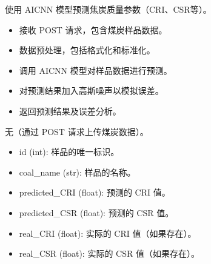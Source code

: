 \documentclass[a4paper,12pt,english]{sphinxmanual}
\begin{document}

\begin{fulllineitems}
\label{\detokenize{api/login:login.getCokeQualityfyeResultCNN}}
\pysigstartsignatures
{}
\pysigstopsignatures
\sphinxAtStartPar
使用 AICNN 模型预测焦炭质量参数（CRI、CSR等）。
\begin{description}
\begin{itemize}
\item {} 
\sphinxAtStartPar
接收 POST 请求，包含煤炭样品数据。

\item {} 
\sphinxAtStartPar
数据预处理，包括格式化和标准化。

\item {} 
\sphinxAtStartPar
调用 AICNN 模型对样品数据进行预测。

\item {} 
\sphinxAtStartPar
对预测结果加入高斯噪声以模拟误差。

\item {} 
\sphinxAtStartPar
返回预测结果及误差分析。

\end{itemize}

\sphinxAtStartPar
无（通过 POST 请求上传煤炭数据）。

\begin{description}
\begin{itemize}
\item {} 
\sphinxAtStartPar
id (int): 样品的唯一标识。

\item {} 
\sphinxAtStartPar
coal\_name (str): 样品的名称。

\item {} 
\sphinxAtStartPar
predicted\_CRI (float): 预测的 CRI 值。

\item {} 
\sphinxAtStartPar
predicted\_CSR (float): 预测的 CSR 值。

\item {} 
\sphinxAtStartPar
real\_CRI (float): 实际的 CRI 值（如果存在）。

\item {} 
\sphinxAtStartPar
real\_CSR (float): 实际的 CSR 值（如果存在）。


\end{itemize}
\end{description}
\end{description}
\end{fulllineitems}
\end{document}
